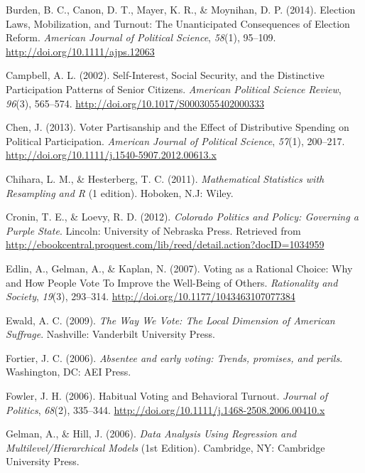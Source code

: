 \documentclass[12pt,twoside]{reedthesis}
\begin{document}
  \hypertarget{ref-burden_election_2014}{}
  Burden, B. C., Canon, D. T., Mayer, K. R., \& Moynihan, D. P. (2014).
  Election Laws, Mobilization, and Turnout: The Unanticipated Consequences
  of Election Reform. \emph{American Journal of Political Science},
  \emph{58}(1), 95--109. \url{http://doi.org/10.1111/ajps.12063}
  
  \hypertarget{ref-campbell_self-interest_2002}{}
  Campbell, A. L. (2002). Self-Interest, Social Security, and the
  Distinctive Participation Patterns of Senior Citizens. \emph{American
  Political Science Review}, \emph{96}(3), 565--574.
  \url{http://doi.org/10.1017/S0003055402000333}
  
  \hypertarget{ref-chen_voter_2013}{}
  Chen, J. (2013). Voter Partisanship and the Effect of Distributive
  Spending on Political Participation. \emph{American Journal of Political
  Science}, \emph{57}(1), 200--217.
  \url{http://doi.org/10.1111/j.1540-5907.2012.00613.x}
  
  \hypertarget{ref-chihara_mathematical_2011}{}
  Chihara, L. M., \& Hesterberg, T. C. (2011). \emph{Mathematical
  Statistics with Resampling and R} (1 edition). Hoboken, N.J: Wiley.
  
  \hypertarget{ref-cronin_colorado_2012}{}
  Cronin, T. E., \& Loevy, R. D. (2012). \emph{Colorado Politics and
  Policy: Governing a Purple State}. Lincoln: University of Nebraska
  Press. Retrieved from
  \url{http://ebookcentral.proquest.com/lib/reed/detail.action?docID=1034959}
  
  \hypertarget{ref-edlin_voting_2007}{}
  Edlin, A., Gelman, A., \& Kaplan, N. (2007). Voting as a Rational
  Choice: Why and How People Vote To Improve the Well-Being of Others.
  \emph{Rationality and Society}, \emph{19}(3), 293--314.
  \url{http://doi.org/10.1177/1043463107077384}
  
  \hypertarget{ref-ewald_way_2009}{}
  Ewald, A. C. (2009). \emph{The Way We Vote: The Local Dimension of
  American Suffrage}. Nashville: Vanderbilt University Press.
  
  \hypertarget{ref-fortier_absentee_2006}{}
  Fortier, J. C. (2006). \emph{Absentee and early voting: Trends,
  promises, and perils}. Washington, DC: AEI Press.
  
  \hypertarget{ref-fowler_habitual_2006}{}
  Fowler, J. H. (2006). Habitual Voting and Behavioral Turnout.
  \emph{Journal of Politics}, \emph{68}(2), 335--344.
  \url{http://doi.org/10.1111/j.1468-2508.2006.00410.x}
  
  \hypertarget{ref-gelman_data_2006}{}
  Gelman, A., \& Hill, J. (2006). \emph{Data Analysis Using Regression and
  Multilevel/Hierarchical Models} (1st Edition). Cambridge, NY: Cambridge
  University Press.
  
\end{document}
